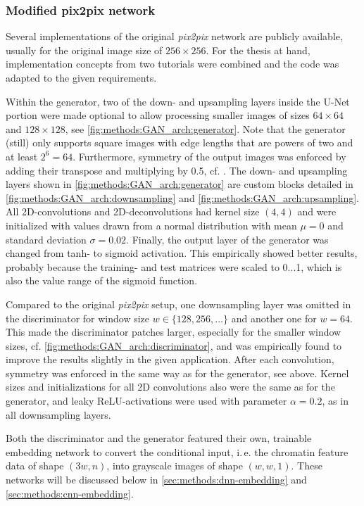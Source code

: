 \subsubsection{Modified pix2pix network}\label{sec:methods:cGAN_initial}
Several implementations of the original \emph{pix2pix} network \cite{Isola2017} are publicly available, usually for the original image size of $256\times256$.
For the thesis at hand, implementation concepts from two tutorials \cite{tfpix2pix2020, brownlee2019} were combined and the code was adapted to the given requirements.

Within the generator, two of the down- and upsampling layers inside the U-Net portion were made optional 
to allow processing smaller images of sizes $64\times64$ and $128\times128$, see \cref{fig:methods:GAN_arch:generator}.
Note that the generator (still) only supports square images with edge lengths that are powers of two and at least $2^6=64$.
Furthermore, symmetry of the output images was enforced by adding their transpose and multiplying by 0.5, cf. \cite{Fudenberg2020}.
The down- and upsampling layers shown in  \cref{fig:methods:GAN_arch:generator} are custom blocks 
detailed in \cref{fig:methods:GAN_arch:downsampling} and \ref{fig:methods:GAN_arch:upsampling}. 
All 2D-convolutions and 2D-deconvolutions had kernel size $(4,4)$ and were initialized with values drawn from a normal distribution with mean $\mu=0$ and
standard deviation $\sigma=0.02$.
Finally, the output layer of the generator was changed from tanh- to sigmoid activation.
This empirically showed better results, probably because the training- and test matrices were scaled to 0...1, which 
is also the value range of the sigmoid function.

Compared to the original \emph{pix2pix} setup, 
one downsampling layer was omitted in the discriminator for window size $w\in\{128,256,\dots\}$ and another one for $w=64$.
This made the discriminator patches larger, especially for the smaller window sizes,
cf. \cref{fig:methods:GAN_arch:discriminator}, and was empirically found to improve the results
slightly in the given application.
After each convolution, symmetry was enforced in the same way as for the generator, see above.
Kernel sizes and initializations for all 2D convolutions also were the same as for the generator,
and leaky ReLU-activations were used with parameter $\alpha=0.2$, as in all downsampling layers.

Both the discriminator and the generator featured their own, trainable embedding network
to convert the conditional input, i.\,e. the chromatin feature data of shape $(3w, n)$,
into grayscale images of shape $(w,w,1)$. 
These networks will be discussed below in \cref{sec:methods:dnn-embedding}
and \cref{sec:methods:cnn-embedding}.

